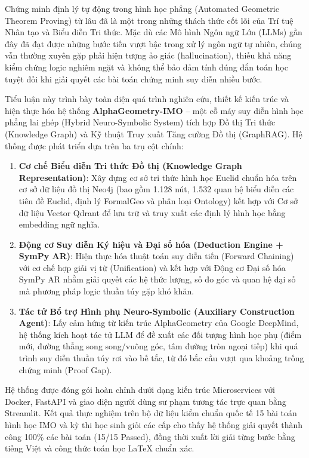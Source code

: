 Chứng minh định lý tự động trong hình học phẳng (Automated Geometric Theorem Proving) từ lâu đã là một trong những thách thức cốt lõi của Trí tuệ Nhân tạo và Biểu diễn Tri thức. Mặc dù các Mô hình Ngôn ngữ Lớn (LLMs) gần đây đã đạt được những bước tiến vượt bậc trong xử lý ngôn ngữ tự nhiên, chúng vẫn thường xuyên gặp phải hiện tượng ảo giác (hallucination), thiếu khả năng kiểm chứng logic nghiêm ngặt và không thể bảo đảm tính đúng đắn toán học tuyệt đối khi giải quyết các bài toán chứng minh suy diễn nhiều bước.

Tiểu luận này trình bày toàn diện quá trình nghiên cứu, thiết kế kiến trúc và hiện thực hóa hệ thống \textbf{AlphaGeometry-IMO} -- một cỗ máy suy diễn hình học phẳng lai ghép (Hybrid Neuro-Symbolic System) tích hợp Đồ thị Tri thức (Knowledge Graph) và Kỹ thuật Truy xuất Tăng cường Đồ thị (GraphRAG). Hệ thống được phát triển dựa trên ba trụ cột chính:
\begin{enumerate}
    \item \textbf{Cơ chế Biểu diễn Tri thức Đồ thị (Knowledge Graph Representation)}: Xây dựng cơ sở tri thức hình học Euclid chuẩn hóa trên cơ sở dữ liệu đồ thị Neo4j (bao gồm 1.128 nút, 1.532 quan hệ biểu diễn các tiên đề Euclid, định lý FormalGeo và phân loại Ontology) kết hợp với Cơ sở dữ liệu Vector Qdrant để lưu trữ và truy xuất các định lý hình học bằng embedding ngữ nghĩa.
    \item \textbf{Động cơ Suy diễn Ký hiệu và Đại số hóa (Deduction Engine + SymPy AR)}: Hiện thực hóa thuật toán suy diễn tiến (Forward Chaining) với cơ chế hợp giải vị từ (Unification) và kết hợp với Động cơ Đại số hóa SymPy AR nhằm giải quyết các hệ thức lượng, số đo góc và quan hệ đại số mà phương pháp logic thuần túy gặp khó khăn.
    \item \textbf{Tác tử Bổ trợ Hình phụ Neuro-Symbolic (Auxiliary Construction Agent)}: Lấy cảm hứng từ kiến trúc AlphaGeometry của Google DeepMind, hệ thống kích hoạt tác tử LLM để đề xuất các đối tượng hình học phụ (điểm mới, đường thẳng song song/vuông góc, tâm đường tròn ngoại tiếp) khi quá trình suy diễn thuần túy rơi vào bế tắc, từ đó bắc cầu vượt qua khoảng trống chứng minh (Proof Gap).
\end{enumerate}

Hệ thống được đóng gói hoàn chỉnh dưới dạng kiến trúc Microservices với Docker, FastAPI và giao diện người dùng sư phạm tương tác trực quan bằng Streamlit. Kết quả thực nghiệm trên bộ dữ liệu kiểm chuẩn quốc tế 15 bài toán hình học IMO và kỳ thi học sinh giỏi các cấp cho thấy hệ thống giải quyết thành công 100\% các bài toán (15/15 Passed), đồng thời xuất lời giải từng bước bằng tiếng Việt và công thức toán học LaTeX chuẩn xác.


